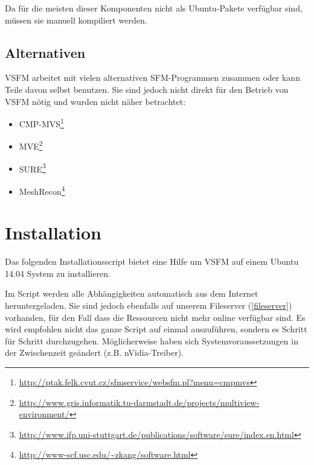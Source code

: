 \noindent Da für die meisten dieser Komponenten nicht als Ubuntu-Pakete
verfügbar sind, müssen sie manuell kompiliert werden.

\subsection{Alternativen}

VSFM arbeitet mit vielen alternativen SFM-Programmen zusammen oder kann Teile davon selbst
benutzen. Sie sind jedoch nicht direkt für den Betrieb von VSFM nötig und wurden
nicht näher betrachtet:

\begin{itemize}
	\item CMP-MVS\footnote{\url{http://ptak.felk.cvut.cz/sfmservice/websfm.pl?menu=cmpmvs}}
	\item MVE\footnote{\url{http://www.gris.informatik.tu-darmstadt.de/projects/multiview-environment/}}
	\item SURE\footnote{\url{http://www.ifp.uni-stuttgart.de/publications/software/sure/index.en.html}}
	\item MeshRecon\footnote{\url{http://www-scf.usc.edu/~zkang/software.html}}
\end{itemize}


\section{Installation}

Das folgenden Installationsscript bietet eine Hilfe um VSFM auf einem Ubuntu
14.04 System zu installieren.

Im Script werden alle Abhängigkeiten automatisch aus dem Internet
heruntergeladen. Sie sind jedoch ebenfalls auf unserem Fileserver
(\autoref{fileserver}) vorhanden, für den Fall dass die Ressourcen nicht mehr
online verfügbar sind. Es wird empfohlen nicht das ganze Script auf einmal
auszuführen, sondern es Schritt für Schritt durchzugehen. Möglicherweise haben
sich Systemvoraussetzungen in der Zwischenzeit geändert (z.B. nVidia-Treiber).

